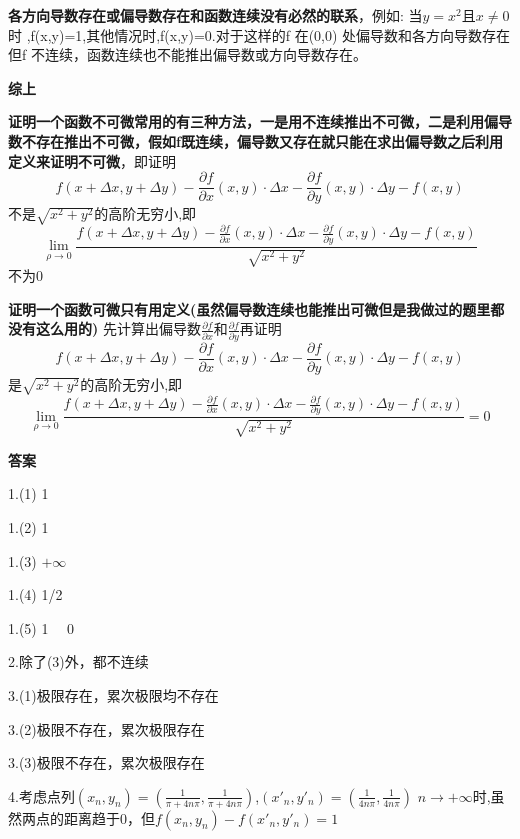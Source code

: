 \documentclass{ctexart}
\begin{document}
\textbf{各方向导数存在或偏导数存在和函数连续没有必然的联系}，例如: 当$y=x^{2}$且$x\neq 0$时 ,f(x,y)=1,其他情况时,f(x,y)=0.对于这样的f 在(0,0) 处偏导数和各方向导数存在但f 不连续，函数连续也不能推出偏导数或方向导数存在。

\textbf{综上}

\textbf{证明一个函数不可微常用的有三种方法，一是用不连续推出不可微，二是利用偏导数不存在推出不可微，假如f既连续，偏导数又存在就只能在求出偏导数之后利用定义来证明不可微}，即证明
$$f(x+\Delta x,y+\Delta y)-\frac{\partial f}{\partial x}(x,y)\cdot \Delta x-\frac{\partial f}{\partial y}(x,y)\cdot \Delta y-f(x,y)$$不是$\sqrt{x^{2}+y^{2}}$的高阶无穷小,即$$\lim_{\rho\rightarrow 0}\frac{f(x+\Delta x,y+\Delta y)-\frac{\partial f}{\partial x}(x,y)\cdot \Delta x-\frac{\partial f}{\partial y}(x,y)\cdot \Delta y-f(x,y)}{\sqrt{x^{2}+y^{2}}}$$不为0

\textbf{证明一个函数可微只有用定义(虽然偏导数连续也能推出可微但是我做过的题里都没有这么用的)}
先计算出偏导数$\frac{\partial f}{\partial x}$和$\frac{\partial f}{\partial y}$再证明$$f(x+\Delta x,y+\Delta y)-\frac{\partial f}{\partial x}(x,y)\cdot \Delta x-\frac{\partial f}{\partial y}(x,y)\cdot \Delta y-f(x,y)$$是$\sqrt{x^{2}+y^{2}}$的高阶无穷小,即$$\lim_{\rho\rightarrow 0}\frac{f(x+\Delta x,y+\Delta y)-\frac{\partial f}{\partial x}(x,y)\cdot \Delta x-\frac{\partial f}{\partial y}(x,y)\cdot \Delta y-f(x,y)}{\sqrt{x^{2}+y^{2}}}=0$$




\textbf{答案}

1.(1) 1

1.(2) 1

1.(3) $+\infty$

1.(4) 1/2

1.(5) 1 \ \ 0

2.除了(3)外，都不连续

3.(1)极限存在，累次极限均不存在

3.(2)极限不存在，累次极限存在

3.(3)极限不存在，累次极限存在

4.考虑点列$(x_{n},y_{n})=(\frac{1}{\pi+4n\pi},\frac{1}{\pi+4n\pi})$,$(x'_{n},y'_{n})=(\frac{1}{4n\pi},\frac{1}{4n\pi})$
$n\rightarrow +\infty$时,虽然两点的距离趋于0，但$f(x_{n},y_{n})-f(x'_{n},y'_{n})=1$
\end{document}
